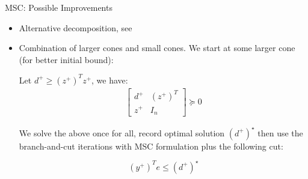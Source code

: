 \begin{frame}{MSC: Possible Improvements}
  \begin{itemize}
    \item Alternative decomposition, see \cite{zheng_nonconvex_2011}
    \item Combination of larger cones and small cones. We start at some larger cone (for better initial bound):

          Let \(d^+ \ge (z^+)^T z^+\), we have:
          \[\begin{aligned}
              \begin{bmatrix}d^+ & (z^+)^T\\ z^+ & I_n \end{bmatrix} \succeq 0
            \end{aligned}\]

          We solve the above once for all, record optimal solution \( (d^+)^\star\)  then use the branch-and-cut iterations with MSC formulation plus the following cut:

          \[(y^+)^Te \le (d^+)^\star\]
  \end{itemize}


\end{frame}

